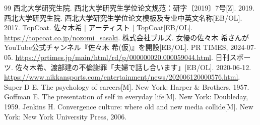 \begin{thebibliography}{99}
 西北大学研究生院. 西北大学研究生学位论文规范：研字〔2019〕7号[Z]. 2019.
 西北大学研究生院. 西北大学研究生学位论文模板及专业中英文名称[EB/OL]. 2017.
 TopCoat. 佐々木希 | アーティスト | TopCoat[EB/OL]. \url{https://topcoat.co.jp/nozomi_sasaki}.
 株式会社ブルズ. 女優の佐々木 希さんがYouTube公式チャンネル『佐々木 希(仮)』を開設[EB/OL]. PR TIMES, 2024-07-05. \url{https://prtimes.jp/main/html/rd/p/000000020.000059044.html}.
 日刊スポーツ. 佐々木希、渡部建の不倫謝罪「夫婦で話し合います」[EB/OL]. 2020-06-12. \url{https://www.nikkansports.com/entertainment/news/202006120000576.html}.
 Super D E. The psychology of careers[M]. New York: Harper \& Brothers, 1957.
 Goffman E. The presentation of self in everyday life[M]. New York: Doubleday, 1959.
 Jenkins H. Convergence culture: where old and new media collide[M]. New York: New York University Press, 2006.
\end{thebibliography}
